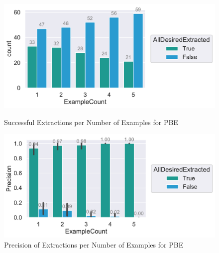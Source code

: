 \documentclass[\myrootdir/main.tex]{subfiles}
\begin{document}
\begin{figure}[htbp]
	\centering
	\begin{minipage}{0.45\textwidth}
		\centering
		\includegraphics[width=\textwidth, clip]{img/big-study/success-examples-pbe.pdf}
		\caption{Successful Extractions per Number of Examples for PBE}
		\label{fig:success-examples-pbe}
	\end{minipage}\hfill
	\begin{minipage}{0.45\textwidth}
		\centering
		\includegraphics[width=\textwidth, clip]{img/big-study/precision-pbe.pdf}
		\caption{Precision of Extractions per Number of Examples for PBE}
		\label{fig:precision-pbe}
	\end{minipage}
\end{figure}
\end{document}
